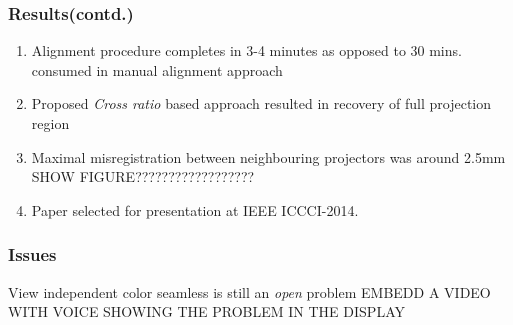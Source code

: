 \documentclass{beamer}
\begin{document}
\begin{frame}
\frametitle{Results(contd.)}
\begin{enumerate}
\item Alignment procedure completes in 3-4 minutes as opposed to 30 mins. consumed in manual alignment approach
\item Proposed \textit{Cross ratio} based approach resulted in recovery of full projection region
\item Maximal misregistration between neighbouring projectors was around 2.5mm
SHOW FIGURE??????????????????
\item Paper selected for presentation at IEEE ICCCI-2014.
\end{enumerate}
\end{frame}


\begin{frame}
\frametitle{Issues}
View independent color seamless is still an \textit{open} problem
EMBEDD A VIDEO WITH VOICE SHOWING THE PROBLEM IN THE DISPLAY
\end{frame}
\end{document}
